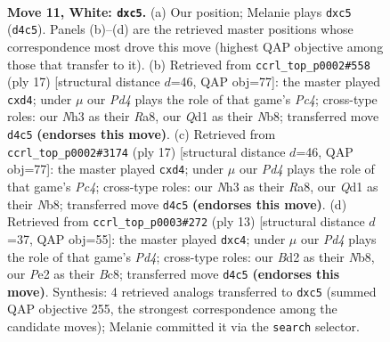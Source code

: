 \documentclass[11pt]{article}
\begin{document}
\clearpage

\begin{figure}[p]\centering
\begin{subfigure}{0.46\textwidth}\centering
\resizebox{\linewidth}{!}{%
\newchessgame
\chessboard[
  setfen={rn1qk2r/p3bpp1/bp3n2/2pp3p/3P4/1P4PN/P2BPPBP/RN1QK2R w KQkq - 0 11},
  showmover=false,
  pgfstyle=straightmove, color=movearrow, markmove={d4-c5}
]}
\caption{}
\end{subfigure}\hfill
\begin{subfigure}{0.46\textwidth}\centering
\resizebox{\linewidth}{!}{%
\newchessgame
\chessboard[
  setfen={rn1qkb1r/pb3ppp/1p2pn2/2p5/3PP3/P1NB1N2/1P3PPP/R1BQK2R b KQkq - 0 9},
  showmover=false,
  pgfstyle=straightmove, color=movearrow, markmove={c5-d4}
]}
\caption{}
\end{subfigure}
\\[4pt]
\begin{subfigure}{0.46\textwidth}\centering
\resizebox{\linewidth}{!}{%
\newchessgame
\chessboard[
  setfen={rn1qkb1r/pb3ppp/1p2pn2/2p5/3PP3/P1NB1N2/1P3PPP/R1BQK2R b KQkq - 0 9},
  showmover=false,
  pgfstyle=straightmove, color=movearrow, markmove={c5-d4}
]}
\caption{}
\end{subfigure}\hfill
\begin{subfigure}{0.46\textwidth}\centering
\resizebox{\linewidth}{!}{%
\newchessgame
\chessboard[
  setfen={rnbqkb1r/pp3pp1/4pn1p/3p4/2PP4/P1N2N2/1P3PPP/R1BQKB1R b KQkq - 0 7},
  showmover=false,
  pgfstyle=straightmove, color=movearrow, markmove={d5-c4}
]}
\caption{}
\end{subfigure}
\caption{\textbf{Move 11, White: \texttt{dxc5}.} (a) Our position; Melanie plays \texttt{dxc5} (\texttt{d4c5}). Panels (b)--(d) are the retrieved master positions whose correspondence most drove this move (highest QAP objective among those that transfer to it). (b) Retrieved from \texttt{ccrl\_top\_p0002\#558} (ply 17) [structural distance $d$=46, QAP obj=77]: the master played \texttt{cxd4}; under $\mu$ our \emph{Pd4} plays the role of that game's \emph{Pc4}; cross-type roles: our \emph{N}h3 as their \emph{R}a8, our \emph{Q}d1 as their \emph{N}b8; transferred move \texttt{d4c5} \textbf{(endorses this move)}. (c) Retrieved from \texttt{ccrl\_top\_p0002\#3174} (ply 17) [structural distance $d$=46, QAP obj=77]: the master played \texttt{cxd4}; under $\mu$ our \emph{Pd4} plays the role of that game's \emph{Pc4}; cross-type roles: our \emph{N}h3 as their \emph{R}a8, our \emph{Q}d1 as their \emph{N}b8; transferred move \texttt{d4c5} \textbf{(endorses this move)}. (d) Retrieved from \texttt{ccrl\_top\_p0003\#272} (ply 13) [structural distance $d$=37, QAP obj=55]: the master played \texttt{dxc4}; under $\mu$ our \emph{Pd4} plays the role of that game's \emph{Pd4}; cross-type roles: our \emph{B}d2 as their \emph{N}b8, our \emph{P}e2 as their \emph{B}c8; transferred move \texttt{d4c5} \textbf{(endorses this move)}. Synthesis: 4 retrieved analogs transferred to \texttt{dxc5} (summed QAP objective 255, the strongest correspondence among the candidate moves); Melanie committed it via the \texttt{search} selector.}
\label{fig:thought-m20}
\end{figure}
\end{document}

